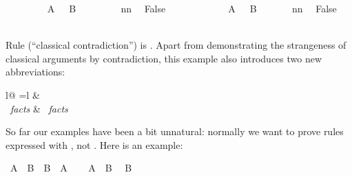 \begin{isabellebody}
\ \ \ \ \ \ \isamarkupfalse%
\ {\isachardoublequote}{\isasymnot}\ A\ {\isasymor}\ {\isasymnot}\ B{\isachardoublequote}\ \isamarkupfalse%
\isacommand{{\isachardot}{\isachardot}}\isanewline
\ \ \ \ \ \ \isamarkupfalse%
\ nn\ \isamarkupfalse%
\ False\ \isamarkupfalse%
\isacommand{{\isachardot}{\isachardot}}\isanewline
\ \ \ \ \isamarkupfalse%
\isanewline
\ \ \ \ \isamarkupfalse%
\ {\isachardoublequote}{\isasymnot}\ A\ {\isasymor}\ {\isasymnot}\ B{\isachardoublequote}\ \isamarkupfalse%
\isacommand{{\isachardot}{\isachardot}}\isanewline
\ \ \ \ \isamarkupfalse%
\ nn\ \isamarkupfalse%
\ False\ \isamarkupfalse%
\isacommand{{\isachardot}{\isachardot}}\isanewline
\ \ \isamarkupfalse%
\isanewline
\isamarkupfalse%
%
\endisatagproof
{\isafoldproof}%
%
\isadelimproof
%
\endisadelimproof
\isamarkuptrue%
%
\begin{isamarkuptext}%
\noindent
Rule  (``classical contradiction'') is
.
Apart from demonstrating the strangeness of classical
arguments by contradiction, this example also introduces two new
abbreviations:
\begin{center}
\begin{tabular}{l@ {\quad=\quad}l}
 &   \\
~\emph{facts} &
~\emph{facts} 
\end{tabular}
\end{center}%
\end{isamarkuptext}%
\isamarkuptrue%
%
\isamarkuptrue%
%
\begin{isamarkuptext}%
So far our examples have been a bit unnatural: normally we want to
prove rules expressed with \isa{{\isasymLongrightarrow}}, not \isa{{\isasymlongrightarrow}}. Here is an example:%
\end{isamarkuptext}%
\isamarkupfalse%
\ {\isachardoublequote}A\ {\isasymand}\ B\ {\isasymLongrightarrow}\ B\ {\isasymand}\ A{\isachardoublequote}\isanewline
%
\isadelimproof
%
\endisadelimproof
%
\isatagproof
\isamarkupfalse%
\isanewline
\ \ \isamarkupfalse%
\ {\isachardoublequote}A\ {\isasymand}\ B{\isachardoublequote}\ \isamarkupfalse%
\ {\isachardoublequote}B{\isachardoublequote}\ \isamarkupfalse%

\end{isabellebody}
